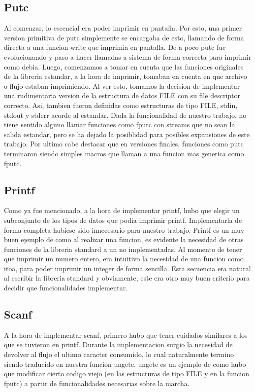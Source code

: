 \documentclass[a4paper,10pt]{article}
\begin{document}
    \subsection{Putc}
        Al comenzar, lo escencial era poder imprimir en pantalla. Por esto, una primer version primitiva de putc simplemente se encargaba de esto, llamando de forma directa a una funcion write que imprimia en pantalla. De a poco putc fue evolucionando y paso a hacer llamadas a sistema de forma correcta para imprimir como debia.
        Luego, comenzamos a tomar en cuenta que las funciones originales de la libreria estandar, a la hora de imprimir, tomaban en cuenta en que archivo o flujo estaban imprimiendo. Al ver esto, tomamos la decision de implementar una rudimentaria version de la estructura de datos FILE con su file descriptor correcto. Asi, tambien fueron definidas como estructuras de tipo FILE, stdin, stdout y stderr acorde al estandar. Dada la funcionalidad de nuestro trabajo, no tiene sentido alguno llamar funciones como fputc con streams que no sean la salida estandar, pero se ha dejado la posiblidad para posibles expansiones de este trabajo.
        Por ultimo cabe destacar que en versiones finales, funciones como putc terminaron siendo simples macros que llaman a una funcion mas generica como fputc.

    \subsection{Printf}
        Como ya fue mencionado, a la hora de implementar printf, hubo que elegir un subconjunto de los tipos de datos que podia imprimir printf. Implementarla de forma completa hubiese sido innecesario para nuestro trabajo. Printf es un muy buen ejemplo de como al realizar una funcion, es evidente la necesidad de otras funciones de la libreria standard a un no implementadas. Al momento de tener que imprimir un numero entero, era intuitivo la necesidad de una funcion como itoa, para poder imprimir un integer de forma sencilla. Esta secuencia era natural al escribir la libreria standard y obviamente, este era otro muy buen criterio para decidir que funcionalidades implementar.

    \subsection{Scanf}    
        A la hora de implementar scanf, primero hubo que tener cuidados similares a los que se tuvieron en printf. Durante la implementacion surgio la necesidad de devolver al flujo el ultimo caracter consumido, lo cual naturalmente termino siendo traducido en nuestra funcion ungetc. ungetc es un ejemplo de como hubo que modificar cierto codigo viejo (en las estructuras de tipo FILE y en la funcion fputc) a partir de funcionalidades necesarias sobre la marcha.
\newpage
\end{document}
